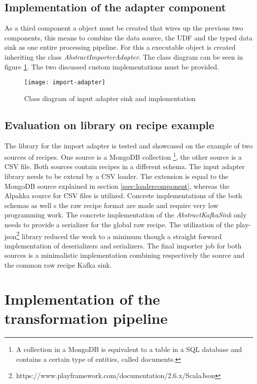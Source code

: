 \subsection{Implementation of the adapter component}

As a third component a object must be created that wires up the previous two components, this means to combine the data source, the UDF and the typed data sink as one entire processing pipeline. For this a executable object is created inheriting the class \textit{AbstractImporterAdapter}. The class diagram can be seen in figure \ref{fig:import-adapter}. The two discussed custom implementations must be provided.

\begin{figure}[htb]
  \centering
  \texttt{[image: import-adapter]}\\
  \caption{Class diagram of input adapter sink and implementation}
  \label{fig:import-adapter}
\end{figure}

\subsection{Evaluation on library on recipe example}
The library for the import adapter is tested and showcased on the example of two sources of recipes. One source is a MongoDB collection \footnote{A collection in a MongoDB is equivalent to a table in a SQL database and contains a certain type of entities, called documents.}, the other source is a CSV file. Both sources contain recipes in a different schema. The input adapter library needs to be extend by a CSV loader. The extension is equal to the MongoDB source explained in section \ref{ssec:loadercomponent}, whereas the Alpakka source for CSV files is utilized. Concrete implementations of the both schemas as well s the raw recipe format are made and require very low programming work. The concrete implementation of the \textit{AbstractKafkaSink} only needs to provide a serializer for the global raw recipe. The utilization of the play-json\footnote{https://www.playframework.com/documentation/2.6.x/ScalaJson} library reduced the work to a minimum though a straight forward implementation of deserializers and serializers. The final importer job for both sources is a minimalistic implementation combining respectively the source and the common raw recipe Kafka sink.

\section{Implementation of the transformation pipeline}

